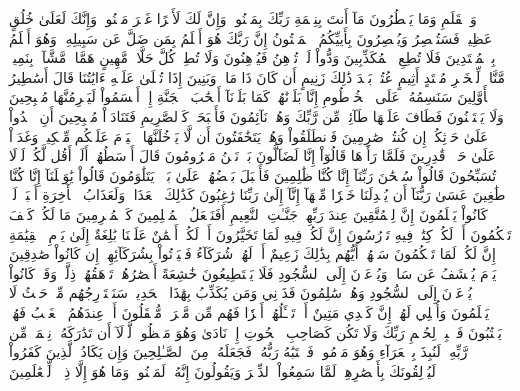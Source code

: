 نٓۚ وَٱلۡقَلَمِ وَمَا يَسۡطُرُونَ
مَآ أَنتَ بِنِعۡمَةِ رَبِّكَ بِمَجۡنُونٖ
وَإِنَّ لَكَ لَأَجۡرًا غَيۡرَ مَمۡنُونٖ
وَإِنَّكَ لَعَلَىٰ خُلُقٍ عَظِيمٖ
فَسَتُبۡصِرُ وَيُبۡصِرُونَ
بِأَييِّكُمُ ٱلۡمَفۡتُونُ
إِنَّ رَبَّكَ هُوَ أَعۡلَمُ بِمَن ضَلَّ عَن سَبِيلِهِۦ وَهُوَ أَعۡلَمُ بِٱلۡمُهۡتَدِينَ
فَلَا تُطِعِ ٱلۡمُكَذِّبِينَ
وَدُّواْ لَوۡ تُدۡهِنُ فَيُدۡهِنُونَ
وَلَا تُطِعۡ كُلَّ حَلَّافٖ مَّهِينٍ
هَمَّازٖ مَّشَّآءِۭ بِنَمِيمٖ
مَّنَّاعٖ لِّلۡخَيۡرِ مُعۡتَدٍ أَثِيمٍ
عُتُلِّۭ بَعۡدَ ذَٰلِكَ زَنِيمٍ
أَن كَانَ ذَا مَالٖ وَبَنِينَ
إِذَا تُتۡلَىٰ عَلَيۡهِ ءَايَٰتُنَا قَالَ أَسَٰطِيرُ ٱلۡأَوَّلِينَ
سَنَسِمُهُۥ عَلَى ٱلۡخُرۡطُومِ
إِنَّا بَلَوۡنَٰهُمۡ كَمَا بَلَوۡنَآ أَصۡحَٰبَ ٱلۡجَنَّةِ إِذۡ أَقۡسَمُواْ لَيَصۡرِمُنَّهَا مُصۡبِحِينَ
وَلَا يَسۡتَثۡنُونَ
فَطَافَ عَلَيۡهَا طَآئِفٞ مِّن رَّبِّكَ وَهُمۡ نَآئِمُونَ
فَأَصۡبَحَتۡ كَٱلصَّرِيمِ
فَتَنَادَوۡاْ مُصۡبِحِينَ
أَنِ ٱغۡدُواْ عَلَىٰ حَرۡثِكُمۡ إِن كُنتُمۡ صَٰرِمِينَ
فَٱنطَلَقُواْ وَهُمۡ يَتَخَٰفَتُونَ
أَن لَّا يَدۡخُلَنَّهَا ٱلۡيَوۡمَ عَلَيۡكُم مِّسۡكِينٞ
وَغَدَوۡاْ عَلَىٰ حَرۡدٖ قَٰدِرِينَ
فَلَمَّا رَأَوۡهَا قَالُوٓاْ إِنَّا لَضَآلُّونَ
بَلۡ نَحۡنُ مَحۡرُومُونَ
قَالَ أَوۡسَطُهُمۡ أَلَمۡ أَقُل لَّكُمۡ لَوۡلَا تُسَبِّحُونَ
قَالُواْ سُبۡحَٰنَ رَبِّنَآ إِنَّا كُنَّا ظَٰلِمِينَ
فَأَقۡبَلَ بَعۡضُهُمۡ عَلَىٰ بَعۡضٖ يَتَلَٰوَمُونَ
قَالُواْ يَٰوَيۡلَنَآ إِنَّا كُنَّا طَٰغِينَ
عَسَىٰ رَبُّنَآ أَن يُبۡدِلَنَا خَيۡرٗا مِّنۡهَآ إِنَّآ إِلَىٰ رَبِّنَا رَٰغِبُونَ
كَذَٰلِكَ ٱلۡعَذَابُۖ وَلَعَذَابُ ٱلۡأٓخِرَةِ أَكۡبَرُۚ لَوۡ كَانُواْ يَعۡلَمُونَ
إِنَّ لِلۡمُتَّقِينَ عِندَ رَبِّهِمۡ جَنَّـٰتِ ٱلنَّعِيمِ
أَفَنَجۡعَلُ ٱلۡمُسۡلِمِينَ كَٱلۡمُجۡرِمِينَ
مَا لَكُمۡ كَيۡفَ تَحۡكُمُونَ
أَمۡ لَكُمۡ كِتَٰبٞ فِيهِ تَدۡرُسُونَ
إِنَّ لَكُمۡ فِيهِ لَمَا تَخَيَّرُونَ
أَمۡ لَكُمۡ أَيۡمَٰنٌ عَلَيۡنَا بَٰلِغَةٌ إِلَىٰ يَوۡمِ ٱلۡقِيَٰمَةِ إِنَّ لَكُمۡ لَمَا تَحۡكُمُونَ
سَلۡهُمۡ أَيُّهُم بِذَٰلِكَ زَعِيمٌ
أَمۡ لَهُمۡ شُرَكَآءُ فَلۡيَأۡتُواْ بِشُرَكَآئِهِمۡ إِن كَانُواْ صَٰدِقِينَ
يَوۡمَ يُكۡشَفُ عَن سَاقٖ وَيُدۡعَوۡنَ إِلَى ٱلسُّجُودِ فَلَا يَسۡتَطِيعُونَ
خَٰشِعَةً أَبۡصَٰرُهُمۡ تَرۡهَقُهُمۡ ذِلَّةٞۖ وَقَدۡ كَانُواْ يُدۡعَوۡنَ إِلَى ٱلسُّجُودِ وَهُمۡ سَٰلِمُونَ
فَذَرۡنِي وَمَن يُكَذِّبُ بِهَٰذَا ٱلۡحَدِيثِۖ سَنَسۡتَدۡرِجُهُم مِّنۡ حَيۡثُ لَا يَعۡلَمُونَ
وَأُمۡلِي لَهُمۡۚ إِنَّ كَيۡدِي مَتِينٌ
أَمۡ تَسۡـَٔلُهُمۡ أَجۡرٗا فَهُم مِّن مَّغۡرَمٖ مُّثۡقَلُونَ
أَمۡ عِندَهُمُ ٱلۡغَيۡبُ فَهُمۡ يَكۡتُبُونَ
فَٱصۡبِرۡ لِحُكۡمِ رَبِّكَ وَلَا تَكُن كَصَاحِبِ ٱلۡحُوتِ إِذۡ نَادَىٰ وَهُوَ مَكۡظُومٞ
لَّوۡلَآ أَن تَدَٰرَكَهُۥ نِعۡمَةٞ مِّن رَّبِّهِۦ لَنُبِذَ بِٱلۡعَرَآءِ وَهُوَ مَذۡمُومٞ
فَٱجۡتَبَٰهُ رَبُّهُۥ فَجَعَلَهُۥ مِنَ ٱلصَّـٰلِحِينَ
وَإِن يَكَادُ ٱلَّذِينَ كَفَرُواْ لَيُزۡلِقُونَكَ بِأَبۡصَٰرِهِمۡ لَمَّا سَمِعُواْ ٱلذِّكۡرَ وَيَقُولُونَ إِنَّهُۥ لَمَجۡنُونٞ
وَمَا هُوَ إِلَّا ذِكۡرٞ لِّلۡعَٰلَمِينَ